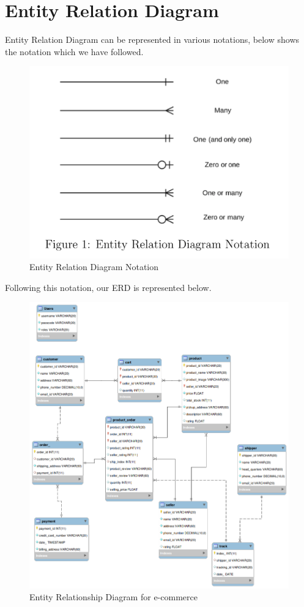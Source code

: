 \documentclass[a4paper,12pt]{article}
\begin{document}
\section{Entity Relation Diagram}
Entity Relation Diagram can be represented in various notations, below shows the notation which we have followed.


\begin{figure}[H]
    \centering
    \includegraphics[width=1\textwidth]{ERDNotation} 
    \caption{Entity Relation Diagram Notation}
\end{figure}

Following this notation, our ERD is represented below.

\begin{figure}[H]
    \centering
    \includegraphics[width=1\textwidth]{ERDL} 
    \caption{Entity Relationship Diagram for e-commerce}
\end{figure}
\end{document}
